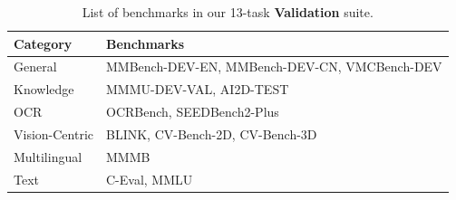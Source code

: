 \begin{table}[h]
\footnotesize
\centering
\caption{List of benchmarks in our 13-task \textbf{Validation} suite.}
\label{tab:validation-benchmarks}
\begin{tabular}{ll}
\toprule
\textbf{Category} & \textbf{Benchmarks} \\
\midrule
General     & MMBench-DEV-EN, MMBench-DEV-CN, VMCBench-DEV \\
Knowledge   & MMMU-DEV-VAL, AI2D-TEST \\
OCR         & OCRBench, SEEDBench2-Plus \\
Vision-Centric & BLINK, CV-Bench-2D, CV-Bench-3D \\
Multilingual & MMMB \\
Text        & C-Eval, MMLU \\
\bottomrule
\end{tabular}
\end{table}
